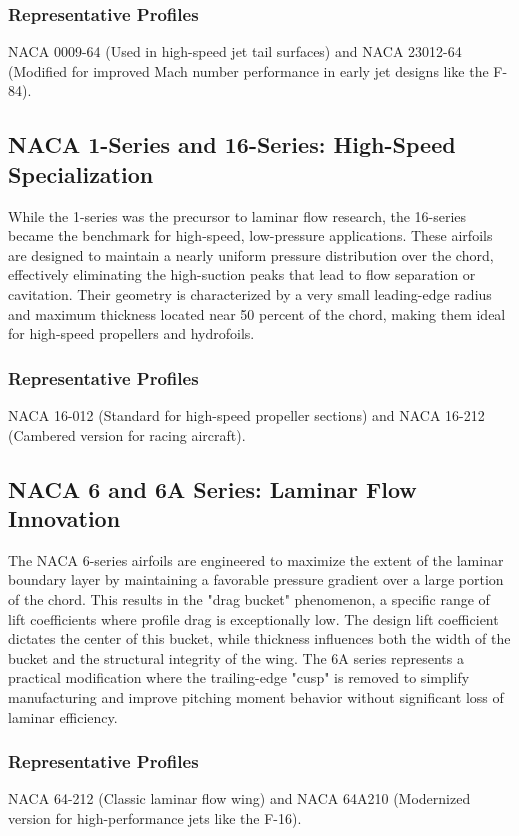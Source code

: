 
\subsubsection*{Representative Profiles}
NACA 0009-64 (Used in high-speed jet tail surfaces) 
and NACA 23012-64 (Modified for improved Mach number performance in early jet designs like the F-84).


\subsection*{NACA 1-Series and 16-Series: High-Speed Specialization}

While the 1-series was the precursor to laminar flow research, 
the 16-series became the benchmark for high-speed, low-pressure applications. These airfoils are designed to maintain a nearly uniform pressure distribution over the chord, 
effectively eliminating the high-suction peaks that lead to flow separation or cavitation. 
Their geometry is characterized by a very small leading-edge radius and maximum thickness located near 50 percent of the chord, 
making them ideal for high-speed propellers and hydrofoils.


\subsubsection*{Representative Profiles}
NACA 16-012 (Standard for high-speed propeller sections) 
and NACA 16-212 (Cambered version for racing aircraft).


\subsection*{NACA 6 and 6A Series: Laminar Flow Innovation}

The NACA 6-series airfoils are engineered to maximize the extent of the laminar boundary layer by maintaining a favorable pressure gradient over a large portion of the chord. 
This results in the "drag bucket" phenomenon, a specific range of lift coefficients where profile drag is exceptionally low. 
The design lift coefficient dictates the center of this bucket, 
while thickness influences both the width of the bucket and the structural integrity of the wing. 
The 6A series represents a practical modification where the trailing-edge "cusp" is removed 
to simplify manufacturing and improve pitching moment behavior without significant loss of laminar efficiency.


\subsubsection*{Representative Profiles}
NACA 64-212 (Classic laminar flow wing) 
and NACA 64A210 (Modernized version for high-performance jets like the F-16).
